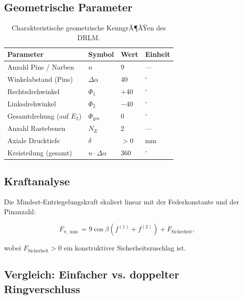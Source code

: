 ﻿\documentclass[12pt, a4paper]{article}
\theoremstyle{remark}
\begin{document}
\subsection{Geometrische Parameter}

\begin{table}[H]
  \centering
  \caption{Charakteristische geometrische KenngrÃ¶ÃŸen des DRLM.}
  \label{tab:parameter}
  \begin{tabular}{llll}
    \toprule
    \textbf{Parameter} & \textbf{Symbol} & \textbf{Wert} & \textbf{Einheit} \\
    \midrule
    Anzahl Pins / Narben & $n$ & 9 & --- \\
    Winkelabstand (Pins) & $\Delta\alpha$ & 40 & \(^\circ\) \\
    Rechtsdrehwinkel & $\Phi_1$ & $+40$ & \(^\circ\) \\
    Linksdrehwinkel & $\Phi_2$ & $-40$ & \(^\circ\) \\
    Gesamtdrehung (auf $E_2$) & $\Phi_{\text{ges}}$ & 0 & \(^\circ\) \\
    Anzahl Rastebenen & $N_E$ & 2 & --- \\
    Axiale Drucktiefe & $\delta$ & $>0$ & mm \\
    Kreisteilung (gesamt) & $n \cdot \Delta\alpha$ & 360 & \(^\circ\) \\
    \bottomrule
  \end{tabular}
\end{table}

\subsection{Kraftanalyse}

Die Mindest-Entriegelungskraft skaliert linear mit der Federkonstante und der Pinanzahl:

\begin{equation}
  F_{\pi,\min} = 9\cos\beta \left(f^{(1)} + f^{(2)}\right) + F_{\text{Sicherheit}},
\end{equation}

wobei $F_{\text{Sicherheit}} > 0$ ein konstruktiver Sicherheitszuschlag ist.

\subsection{Vergleich: Einfacher vs. doppelter Ringverschluss}
\end{document}
